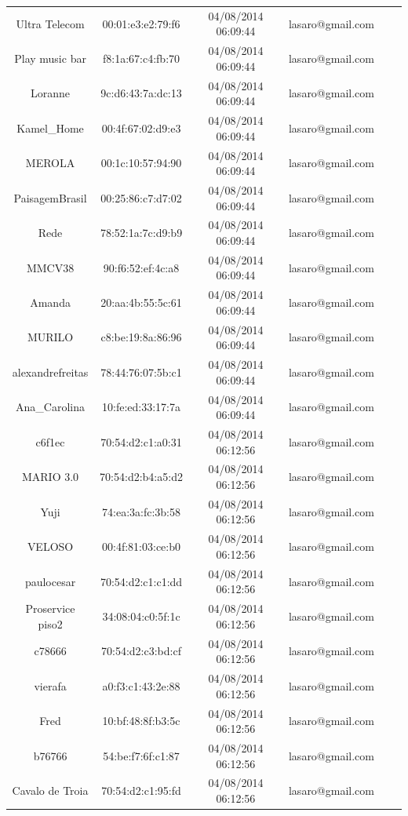 \documentclass[12pt, %
openright, 
oneside,
a4paper,
brazil]{facom-ufu-abntex2}
\begin{document}
\begin{table}
\begin{longtable}{|c|c|c|c|c|c|}
Ultra Telecom & 00:01:e3:e2:79:f6 & 04/08/2014 06:09:44 & lasaro@gmail.com \\
Play music bar & f8:1a:67:c4:fb:70 & 04/08/2014 06:09:44 & lasaro@gmail.com \\
Loranne & 9c:d6:43:7a:dc:13 & 04/08/2014 06:09:44 & lasaro@gmail.com \\
Kamel\_Home & 00:4f:67:02:d9:e3 & 04/08/2014 06:09:44 & lasaro@gmail.com \\
MEROLA & 00:1c:10:57:94:90 & 04/08/2014 06:09:44 & lasaro@gmail.com \\
PaisagemBrasil & 00:25:86:c7:d7:02 & 04/08/2014 06:09:44 & lasaro@gmail.com \\
Rede & 78:52:1a:7c:d9:b9 & 04/08/2014 06:09:44 & lasaro@gmail.com \\
MMCV38 & 90:f6:52:ef:4c:a8 & 04/08/2014 06:09:44 & lasaro@gmail.com \\
Amanda & 20:aa:4b:55:5c:61 & 04/08/2014 06:09:44 & lasaro@gmail.com \\
MURILO & c8:be:19:8a:86:96 & 04/08/2014 06:09:44 & lasaro@gmail.com \\
alexandrefreitas & 78:44:76:07:5b:c1 & 04/08/2014 06:09:44 & lasaro@gmail.com \\
Ana\_Carolina & 10:fe:ed:33:17:7a & 04/08/2014 06:09:44 & lasaro@gmail.com \\
c6f1ec & 70:54:d2:c1:a0:31 & 04/08/2014 06:12:56 & lasaro@gmail.com \\
MARIO 3.0 & 70:54:d2:b4:a5:d2 & 04/08/2014 06:12:56 & lasaro@gmail.com \\
Yuji & 74:ea:3a:fc:3b:58 & 04/08/2014 06:12:56 & lasaro@gmail.com \\
VELOSO & 00:4f:81:03:ce:b0 & 04/08/2014 06:12:56 & lasaro@gmail.com \\
paulocesar & 70:54:d2:c1:c1:dd & 04/08/2014 06:12:56 & lasaro@gmail.com \\
Proservice piso2 & 34:08:04:c0:5f:1c & 04/08/2014 06:12:56 & lasaro@gmail.com \\
c78666 & 70:54:d2:c3:bd:cf & 04/08/2014 06:12:56 & lasaro@gmail.com \\
vierafa & a0:f3:c1:43:2e:88 & 04/08/2014 06:12:56 & lasaro@gmail.com \\
Fred & 10:bf:48:8f:b3:5c & 04/08/2014 06:12:56 & lasaro@gmail.com \\
b76766 & 54:be:f7:6f:c1:87 & 04/08/2014 06:12:56 & lasaro@gmail.com \\
Cavalo de Troia & 70:54:d2:c1:95:fd & 04/08/2014 06:12:56 & lasaro@gmail.com \\

\end{longtable}
\end{table}
\end{document}
